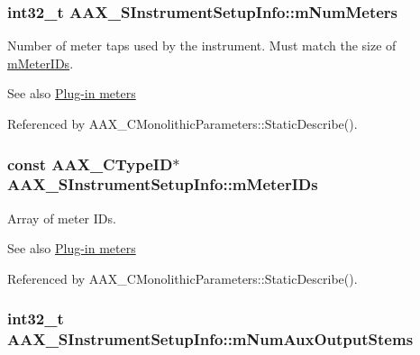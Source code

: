 \subsubsection[{m\+Num\+Meters}]{\setlength{\rightskip}{0pt plus 5cm}int32\+\_\+t A\+A\+X\+\_\+\+S\+Instrument\+Setup\+Info\+::m\+Num\+Meters}\label{a00124_a58815894e89a352e5013046cbfa2a834}


Number of meter taps used by the instrument. Must match the size of \hyperlink{a00124_a996dacfece0048579de34e08cb10b449}{m\+Meter\+I\+Ds}. 

\begin{DoxySeeAlso}{See also}
\hyperlink{a00337}{Plug-\/in meters} 
\end{DoxySeeAlso}


Referenced by A\+A\+X\+\_\+\+C\+Monolithic\+Parameters\+::\+Static\+Describe().

\hypertarget{a00124_a996dacfece0048579de34e08cb10b449}{}
\subsubsection[{m\+Meter\+I\+Ds}]{\setlength{\rightskip}{0pt plus 5cm}const {\bf A\+A\+X\+\_\+\+C\+Type\+I\+D}$\ast$ A\+A\+X\+\_\+\+S\+Instrument\+Setup\+Info\+::m\+Meter\+I\+Ds}\label{a00124_a996dacfece0048579de34e08cb10b449}


Array of meter I\+Ds. 

\begin{DoxySeeAlso}{See also}
\hyperlink{a00337}{Plug-\/in meters} 
\end{DoxySeeAlso}


Referenced by A\+A\+X\+\_\+\+C\+Monolithic\+Parameters\+::\+Static\+Describe().

\hypertarget{a00124_ac969f7d3a23a8bb66d53c8e6d8360dca}{}
\subsubsection[{m\+Num\+Aux\+Output\+Stems}]{\setlength{\rightskip}{0pt plus 5cm}int32\+\_\+t A\+A\+X\+\_\+\+S\+Instrument\+Setup\+Info\+::m\+Num\+Aux\+Output\+Stems}\label{a00124_ac969f7d3a23a8bb66d53c8e6d8360dca}


